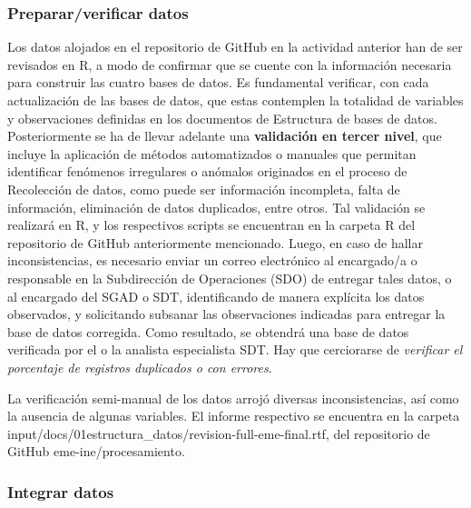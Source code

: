 \documentclass[
]{article}
\begin{document}
\hypertarget{prepararverificar-datos}{%
\subsubsection{Preparar/verificar datos}\label{prepararverificar-datos}}

Los datos alojados en el repositorio de GitHub en la actividad anterior han de ser revisados en R, a modo de confirmar que se cuente con la información necesaria para construir las cuatro bases de datos. Es fundamental verificar, con cada actualización de las bases de datos, que estas contemplen la totalidad de variables y observaciones definidas en los documentos de Estructura de bases de datos. Posteriormente se ha de llevar adelante una \textbf{validación en tercer nivel}, que incluye la aplicación de métodos automatizados o manuales que permitan identificar fenómenos irregulares o anómalos originados en el proceso de Recolección de datos, como puede ser información incompleta, falta de información, eliminación de datos duplicados, entre otros. Tal validación se realizará en R, y los respectivos scripts se encuentran en la carpeta R del repositorio de GitHub anteriormente mencionado. Luego, en caso de hallar inconsistencias, es necesario enviar un correo electrónico al encargado/a o responsable en la Subdirección de Operaciones (SDO) de entregar tales datos, o al encargado del SGAD o SDT, identificando de manera explícita los datos observados, y solicitando subsanar las observaciones indicadas para entregar la base de datos corregida. Como resultado, se obtendrá una base de datos verificada por el o la analista especialista SDT. Hay que cerciorarse de \emph{verificar el porcentaje de registros duplicados o con errores}.

La verificación semi-manual de los datos arrojó diversas inconsistencias, así como la ausencia de algunas variables. El informe respectivo se encuentra en la carpeta input/docs/01estructura\_datos/revision-full-eme-final.rtf, del repositorio de GitHub eme-ine/procesamiento.

\hypertarget{integrar-datos}{%
\subsubsection{Integrar datos}\label{integrar-datos}}
\end{document}
